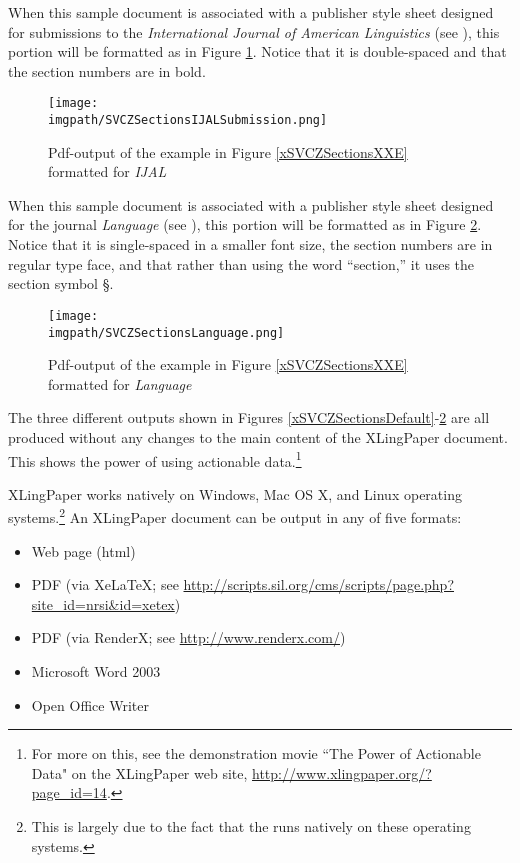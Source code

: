When this sample document is associated with a publisher style sheet designed for submissions to the {\textit{International Journal of American Linguistics}} (see \citet{rIJALStyleSheet}), this portion will be formatted as in Figure \ref{xSVCZSectionsIJALSubmission}.  Notice that it is double-spaced and that the section numbers are in bold.

\clearpage
\begin{figure}[t]
\texttt{[image: \\imgpath/SVCZSectionsIJALSubmission.png]}
\caption{Pdf-output of the example in Figure \ref{xSVCZSectionsXXE} formatted for \textit{IJAL}}
  \label{xSVCZSectionsIJALSubmission}%
\end{figure}


 


When this sample document is associated with a publisher style sheet designed for the journal {\textit{Language}} (see \citet{rLanguageStyleSheet}), this portion will be formatted as in Figure \ref{xSVCZSectionsLanguage}. Notice that it is single-spaced in a smaller font size, the section numbers are in regular type face, and that rather than using the word ``section,'' it uses the section symbol §.

\begin{figure}[h]
\texttt{[image: \\imgpath/SVCZSectionsLanguage.png]}
\caption{Pdf-output of the example in Figure \ref{xSVCZSectionsXXE} formatted for \textit{Language}}
 \label{xSVCZSectionsLanguage}%
\end{figure}

 

The three different outputs shown in Figures \ref{xSVCZSectionsDefault}-\ref{xSVCZSectionsLanguage} are all produced without any changes to the main content of the XLingPaper document.  This shows the power of using actionable data.\footnote{\label{nXLingPaperPowerOfActionableData}
   For more on this, see the demonstration movie ``The Power of Actionable Data" on the XLingPaper web site, \url{http://www.xlingpaper.org/?page\_id=14}.
}

XLingPaper works natively on Windows, Mac OS X, and Linux operating systems.\footnote{\label{nXXEOSes}
   This is largely due to the fact that the {\XMLmindXMLEditor} runs natively on these operating systems.
}  
An XLingPaper document can be output in any of five formats:

\begin{itemize}
  \item {Web page (html)}
  \item {PDF (via XeLaTeX; see \url{http://scripts.sil.org/cms/scripts/page.php?site_id=nrsi&id=xetex})}
  \item {PDF (via RenderX; see \url{http://www.renderx.com/})}
  \item {Microsoft Word 2003}
  \item {Open Office Writer}
\end{itemize}


